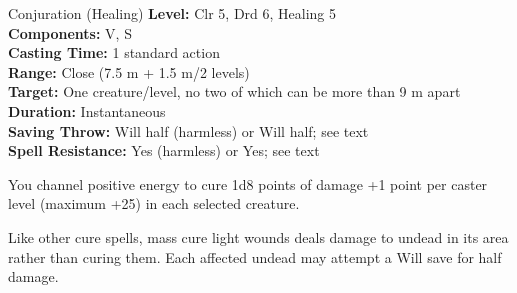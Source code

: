 {Conjuration (Healing)}
{
	\textbf{Level:}
	Clr 5, Drd 6, Healing 5\\
	\textbf{Components:}
	V, S\\
	\textbf{Casting Time:}
	1 standard action\\
	\textbf{Range:}
	Close (7.5 m + 1.5 m/2 levels)\\
	\textbf{Target:}
	One creature/level, no two of which can be more than 9 m apart\\
	\textbf{Duration:}
	Instantaneous\\
	\textbf{Saving Throw:}
	Will half (harmless) or Will half; see text\\
	\textbf{Spell Resistance:}
	Yes (harmless) or Yes; see text\\
}
{
	You channel positive energy to cure 1d8 points of damage +1 point per caster level (maximum +25) in each selected creature.

	Like other cure spells, mass cure light wounds deals damage to undead in its area rather than curing them. Each affected undead may attempt a Will save for half damage.

}
